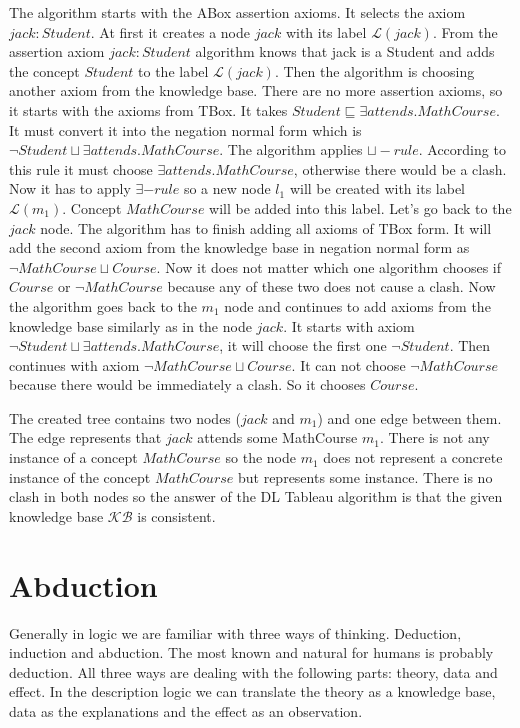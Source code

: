 \documentclass[12pt,a4paper]{article}
\begin{document}
The algorithm starts with the ABox assertion axioms. It selects the axiom $jack : Student$. At first it creates a node $jack$ with its label $\mathcal{L}(jack)$. From the assertion axiom $jack : Student$ algorithm knows that jack is a Student and adds the concept $Student$ to the label $\mathcal{L}(jack)$. Then the algorithm is choosing another axiom from the knowledge base. There are no more assertion axioms, so it starts with the axioms from TBox. It takes $Student \sqsubseteq \exists attends.MathCourse$. It must convert it into the negation normal form which is $\neg Student \sqcup \exists attends.MathCourse$. The algorithm applies $\sqcup-rule$. According to this rule it must choose $\exists attends.MathCourse$, otherwise there would be a clash. Now it has to apply $\exists - rule$ so a new node $l_{1}$ will be created with its label $\mathcal{L}(m_{1})$. Concept $MathCourse$ will be added into this label. Let's go back to the $jack$ node. The algorithm has to finish adding all axioms of TBox form. It will add the second axiom from the knowledge base in negation normal form as $\neg MathCourse \sqcup Course$. Now it does not matter which one algorithm chooses if $Course$ or $\neg MathCourse$ because any of these two does not cause a clash. Now the algorithm goes back to the $m_{1}$ node and continues to add axioms from the knowledge base similarly as in the node $jack$. It starts with axiom $\neg Student \sqcup \exists attends.MathCourse$, it will choose the first one $\neg Student$. Then continues with axiom $\neg MathCourse \sqcup Course$. It can not choose $\neg MathCourse$ because there would be immediately a clash. So it chooses $Course$.

The created tree contains two nodes ($jack$ and $m_{1}$) and one edge between them. The edge represents that $jack$ attends some MathCourse $m_{1}$. There is not any instance of a concept $MathCourse$ so the node $m_{1}$ does not represent a concrete instance of the concept $MathCourse$ but represents some instance. There is no clash in both nodes so the answer of the DL Tableau algorithm is that the given knowledge base $\mathcal{KB}$ is consistent.

\section{Abduction}
Generally in logic we are familiar with three ways of thinking. Deduction, induction and abduction. The most known and natural for humans is probably deduction. All three ways are dealing with the following parts: theory, data and effect. In the description logic we can translate the theory as a knowledge base, data as the explanations and the effect as an observation.
\end{document}
